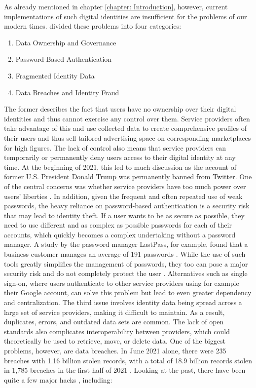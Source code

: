 As already mentioned in chapter \ref{chapter: Introduction}, however, current implementations of such digital identities are insufficient for the problems of our modern times. \cite{soltani_survey_2021} divided these problems into four categories:
\begin{enumerate}
	\item Data Ownership and Governance
	\item Password-Based Authentication
	\item Fragmented Identity Data
	\item Data Breaches and Identity Fraud
\end{enumerate}
The former describes the fact that users have no ownership over their digital identities and thus cannot exercise any control over them. Service providers often take advantage of this and use collected data to create comprehensive profiles of their users and thus sell tailored advertising space on corresponding marketplaces for high figures. The lack of control also means that service providers can temporarily or permanently deny users access to their digital identity at any time. At the beginning of 2021, this led to much discussion as the account of former U.S. President Donald Trump was permanently banned from Twitter. One of the central concerns was whether service providers have too much power over users' liberties \cite{noor_should_2021}. In addition, given the frequent and often repeated use of weak passwords, the heavy reliance on password-based authentication is a security risk that may lead to identity theft. If a user wants to be as secure as possible, they need to use different and as complex as possible passwords for each of their accounts, which quickly becomes a complex undertaking without a password manager. A study by the password manager LastPass, for example, found that a business customer manages an average of 191 passwords \cite{steel_lastpass_2017}. While the use of such tools greatly simplifies the management of passwords, they too can pose a major security risk and do not completely protect the user \cite{oesch_that_2020, ormandy_password_2021, toth_you_2021}. Alternatives such as single sign-on, where users authenticate to other service providers using for example their Google account, can solve this problem but lead to even greater dependency and centralization. The third issue involves identity data being spread across a large set of service providers, making it difficult to maintain. As a result, duplicates, errors, and outdated data sets are common. The lack of open standards also complicates interoperability between providers, which could theoretically be used to retrieve, move, or delete data. \cite[pp. 2-3]{soltani_survey_2021}
One of the biggest problems, however, are data breaches. In June 2021 alone, there were 235 breaches with 1.16 billion stolen records, with a total of 18.9 billion records stolen in 1,785 breaches in the first half of 2021 \cite{risk_based_security_data_2021}. Looking at the past, there have been quite a few major hacks \cite{swinhoe_15_2021}, including: 

